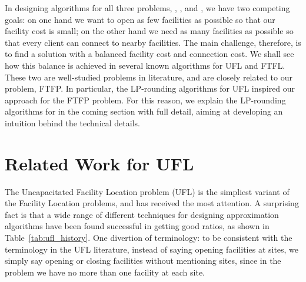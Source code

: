 \documentclass[oneside,final]{ucr}
\begin{document}
In designing algorithms for all three problems, {\UFL},
{\FTFL}, and {\FTFP}, we have two competing goals: on one
hand we want to open as few facilities as possible so that
our facility cost is small; on the other hand we need as
many facilities as possible so that every client can connect
to nearby facilities. The main challenge, therefore, is to
find a solution with a balanced facility cost and connection
cost. We shall see how this balance is achieved in several
known algorithms for UFL and FTFL. These two are
well-studied problems in literature, and are closely related
to our problem, FTFP. In particular, the LP-rounding
algorithms for UFL inspired our approach for the FTFP
problem. For this reason, we explain the LP-rounding
algorithms for {\UFL} in the coming section with full
detail, aiming at developing an intuition behind the
technical details.

\section{Related Work for UFL}
The Uncapacitated Facility Location problem (UFL) is the
simpliest variant of the Facility Location problems, and has
received the most attention. A surprising fact is that a
wide range of different techniques for designing
approximation algorithms have been found successful in
getting good ratios, as shown in
Table~\ref{tab:ufl_history}. One divertion of terminology:
to be consistent with the terminology in the UFL literature,
instead of saying opening facilities at sites, we simply say
opening or closing facilities without mentioning sites,
since in the {\UFL} problem we have no more than one
facility at each site.

\end{document}
